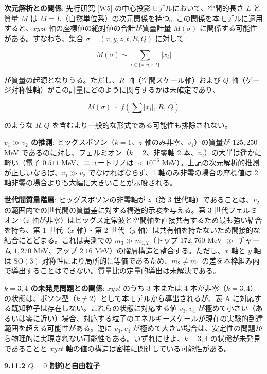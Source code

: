 \documentclass[
  a4paper,11pt]{ltjsarticle}
\theoremstyle{definition}
\theoremstyle{remark}
\begin{document}
\textbf{次元解析との関係}: 先行研究 {[}W5{]}
の中心投影モデルにおいて、空間的長さ \(L\) と質量 \(M\) は
\(M = L\)（自然単位系）の次元関係を持つ。この関係を本モデルに適用すると、\(xyzt\)
軸の座標値の絶対値の合計が質量計量 \(M(\sigma)\)
に関係する可能性がある。すなわち、集合 \(\sigma = (x, y, z, t, R, Q)\)
に対して

\[M(\sigma) \sim \sum_{i \in \{x, y, z, t\}} |x_i|\]

が質量の起源となりうる。ただし、\(R\) 軸（空間スケール軸）および \(Q\)
軸（ゲージ対称性軸）がこの計量にどのように関与するかは未確定であり、

\[M(\sigma) \sim f\!\left(\sum |x_i|,\, R,\, Q\right)\]

のような \(R, Q\) を含むより一般的な形式である可能性も排除されない。

\textbf{\(v_1 \gg v_2\) の推測}: ヒッグスボソン（\(k = 1\)、\(z\)
軸のみ非零、\(v_1\)）の質量が \(125{,}250\) MeV
であるのに対し、フェルミオン（\(k = 2\)、非零軸 2
本、\(v_2\)）の大半は遥かに軽い（電子 \(0.511\) MeV、ニュートリノは
\(< 10^{-6}\) MeV）。上記の次元解析的推測が正しいならば、\(v_1 \gg v_2\)
でなければならず、1 軸のみ非零の場合の座標値は 2
軸非零の場合よりも大幅に大きいことが示唆される。

\textbf{世代間質量階層}: ヒッグスボソンの非零軸が \(z\)（第 3
世代軸）であることは、\(v_2\)
の範囲内での世代間の質量差に対する構造的示唆を与える。第 3
世代フェルミオン（\(z\)
軸が非零）はヒッグス定常波と空間軸を直接共有するため最も強い結合を持ち、第
1 世代（\(x\) 軸）・第 2 世代（\(y\)
軸）は共有軸を持たないため間接的な結合にとどまる。これは実測での
\(m_3 \gg m_{1,2}\)（トップ \(172{,}760\) MeV \(\gg\) チャーム
\(1{,}270\) MeV、アップ \(2.16\)
MeV）の階層構造と整合する。ただし、\(x\) 軸と \(y\) 軸は
\(\mathrm{SO}(3)\) 対称性により局所的に等価であるため、\(m_2 \neq m_1\)
の差を本枠組み内で導出することはできない。質量比の定量的導出は未解決である。

\textbf{\(k = 3, 4\) の未発見問題との関係}: \(xyzt\) のうち 3 本または 4
本が非零（\(k = 3, 4\)）の状態は、ボソン型（\(k \neq 2\)）として本モデルから導出されるが、表
A に対応する既知粒子は存在しない。これらの状態に対応する値 \(v_3, v_4\)
が極めて小さい（あるいは零に近い）場合、対応する粒子のエネルギースケールが現在の実験的到達範囲を超える可能性がある。逆に
\(v_3, v_4\)
が極めて大きい場合は、安定性の問題から物理的に実現されない可能性もある。いずれにせよ、\(k = 3, 4\)
の状態が未発見であることと \(xyzt\)
軸の値の構造は密接に関連している可能性がある。

\textbf{9.11.2 \(Q = 0\) 制約と自由粒子}
\end{document}
